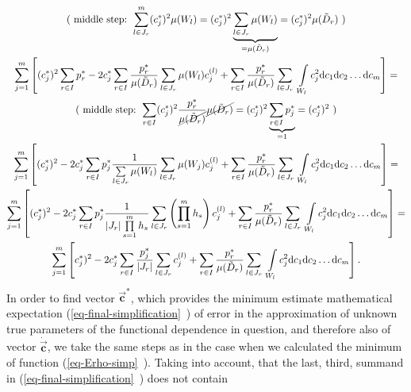 \documentclass[11pt,a4paper]{article}
\numberwithin{equation}{subsection}
\newcommand{\vecc}{\vec{\textbf{c}}}
\begin{document}
\begin{gather}
\nonumber
\text{( middle step: } \sum_{l \in J_{r}}^{m}(c_{j}^{*})^{2} \mu(W_{l}) = (c_{j}^{*})^{2} \underbrace{\sum_{l \in J_{r}} \mu(W_{l})}_{=\mu(\tilde{D}_{r})} = (c_{j}^{*})^{2} \mu(\tilde{D}_{r}) \text{ )} \\
\nonumber
\sum\limits_{j=1}^{m} \left[  (c_{j}^{*})^{2}  \sum\limits_{r \in I} p_{r}^{*}  - 2c_{j}^{*}  \sum\limits_{r \in I} \frac{p_{r}^{*}}{\mu(\tilde{D}_{r})} \sum\limits_{l \in J_{r}} \mu(W_{l})  c_{j}^{(l)}  + \sum\limits_{r \in I} \frac{p_{r}^{*}}{\mu(\tilde{D}_{r})} \sum\limits_{l \in J_{r}} \ \int\limits_{W_{l}} c_{j}^{2}  \mathrm{d}c_{1} \mathrm{d}c_{2} \dots \mathrm{d}c_{m} \right] = \\
\nonumber
\text{( middle step: } \sum_{r \in I} (c_{j}^{*})^{2} \frac{p_{r}^{*}}{\cancel{\mu(\tilde{D}_{r})}} \cancel{\mu(\tilde{D}_{r})} = (c_{j}^{*})^{2} \underbrace{\sum_{r \in I} p_{j}^{*}}_{=1} = (c_{j}^{*})^{2} \text{ )}\\
\nonumber
\sum\limits_{j=1}^{m} \left[  (c_{j}^{*})^{2} - 2c_{j}^{*} \sum\limits_{r \in I} p_{j}^{*} \frac{1}{\sum\limits_{l \in J_{r}} \mu(W_{l})} \sum\limits_{l \in J_{r}} \mu(W_{j}) c_{j}^{(l)} +  \sum\limits_{r \in I} \frac{p_{r}^{*}}{\mu(\tilde{D}_{r})} \sum\limits_{l \in J_{r}} \ \int\limits_{W_{l}} c_{j}^{2}  \mathrm{d}c_{1} \mathrm{d}c_{2} \dots \mathrm{d}c_{m} \right] = \\
\nonumber
\sum\limits_{j=1}^{m}  \left[    (c_{j}^{*})^{2} - 2c_{j}^{*} \sum\limits_{r \in I} p_{j}^{*} \frac{1}{\left| J_{r} \right| \prod\limits_{s=1}^{m} h_{s}} \sum\limits_{l \in J_{r}} \left( \prod_{s=1}^{m} h_{s} \right) c_{j}^{(l)} +  \sum\limits_{r \in I} \frac{p_{r}^{*}}{\mu(\tilde{D}_{r})} \sum\limits_{l \in J_{r}} \ \int\limits_{W_{l}} c_{j}^{2}  \mathrm{d}c_{1} \mathrm{d}c_{2} \dots \mathrm{d}c_{m} \right] = \\
\sum\limits_{j=1}^{m} \left[ c_{j}^{*})^{2} - 2c_{j}^{*} \sum\limits_{r \in I} \frac{p_{j}^{*}}{ \left| J_{r} \right|} \sum\limits_{l \in J_{r}} c_{j}^{(l)} + \sum\limits_{r \in I} \frac{p_{r}^{*}}{\mu(\tilde{D}_{r})} \sum\limits_{l \in J_{r}} \ \int\limits_{W_{l}} c_{j}^{2}  \mathrm{d}c_{1} \mathrm{d}c_{2} \dots \mathrm{d}c_{m} \right]. \label{eq-final-simplification}
\end{gather}
In order to find vector $\vecc^{*}$, which provides the minimum estimate mathematical expectation (\vref{eq-final-simplification}~) of error in the approximation of unknown true parameters of the functional dependence in question, and therefore also of vector $\dot{\vecc}$, we take the same steps as in the case when we calculated the minimum of function (\vref{eq-Erho-simp}~). Taking into account, that the last, third, summand in (\vref{eq-final-simplification}~) does not contain 
\end{document}
